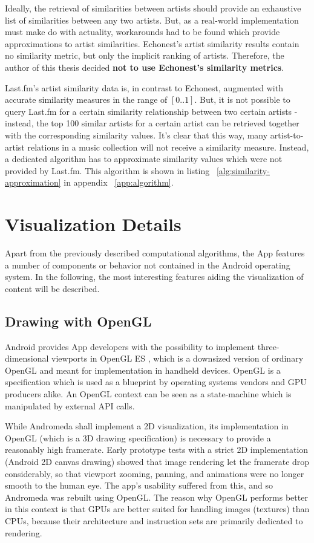 Ideally, the retrieval of similarities between artists should provide an exhaustive list of similarities between any two artists. But, as a real-world implementation must make do with actuality, workarounds had to be found which provide approximations to artist similarities.
Echonest's artist similarity results contain no similarity metric, but only the implicit ranking of artists. Therefore, the author of this thesis decided \textbf{not to use Echonest's similarity metrics}.

Last.fm's artist similarity data is, in contrast to Echonest, augmented with accurate similarity measures in the range of $[0 .. 1]$. But, it is not possible to query Last.fm for a certain similarity relationship between two certain artists - instead, the top 100 similar artists for a certain artist can be retrieved together with the corresponding similarity values. It's clear that this way, many artist-to-artist relations in a music collection will not receive a similarity measure. Instead, a dedicated algorithm has to approximate similarity values which were not provided by Last.fm. This algorithm is shown in listing ~\ref{alg:similarity-approximation} in  appendix ~\ref{app:algorithm}.


\section{Visualization Details}

Apart from the previously described computational algorithms, the App features a number of components or behavior not contained in the Android operating system. In the following, the most interesting features aiding the visualization of content will be described.

\subsection{Drawing with OpenGL}

Android provides App developers with the possibility to implement three-dimensional viewports in OpenGL ES \cite{url:opengles}, which is a downsized version of ordinary OpenGL and meant for implementation in handheld devices. OpenGL is a specification which is used as a blueprint by operating systems vendors and GPU producers alike. An OpenGL context can be seen as a state-machine which is manipulated by external API calls.

While Andromeda shall implement a 2D visualization, its implementation in OpenGL (which is a 3D drawing specification) is necessary to provide a reasonably high framerate. Early prototype tests with a strict 2D implementation (Android 2D canvas drawing) showed that image rendering let the framerate drop considerably, so that viewport zooming, panning, and animations were no longer smooth to the human eye. The app's usability suffered from this, and so Andromeda was rebuilt using OpenGL. The reason why OpenGL performs better in this context is that GPUs are better suited for handling images (textures) than CPUs, because their architecture and instruction sets are primarily dedicated to rendering.

